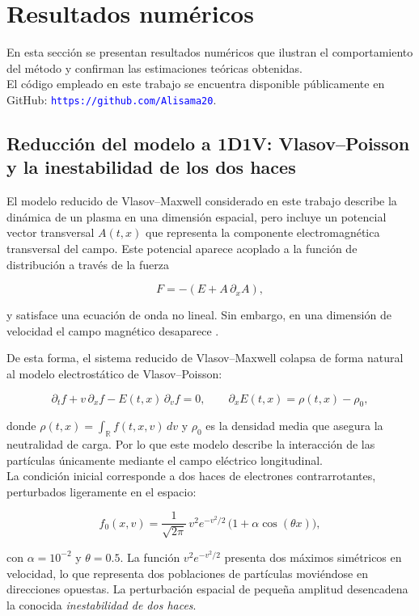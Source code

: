\documentclass[11pt,a4paper,twoside,pdf]{article}
\numberwithin{equation}{section}
\begin{document}
\section{Resultados numéricos}

En esta sección se presentan resultados numéricos que ilustran el
comportamiento del método y confirman las estimaciones teóricas obtenidas.\\

El código empleado en este trabajo se encuentra disponible públicamente en GitHub: \textcolor{blue}{\texttt{https://github.com/Alisama20}}.



\subsection{Reducción del modelo a 1D1V: Vlasov–Poisson y la inestabilidad de los dos haces}



El modelo reducido de Vlasov--Maxwell considerado en este trabajo describe la
dinámica de un plasma en una dimensión espacial, pero incluye un potencial vector
transversal $A(t,x)$ que representa la componente electromagnética transversal del
campo. Este potencial aparece acoplado a la función de distribución a través de la
fuerza


\[
F = -\left(E + A\,\partial_x A\right),
\]


y satisface una ecuación de onda no lineal. Sin embargo, en una dimensión de velocidad el campo magnético desaparece \cite{martin2021campo}.

De esta forma, el sistema reducido de Vlasov--Maxwell colapsa de forma
natural al modelo electrostático de Vlasov--Poisson:


\[
\partial_t f + v\,\partial_x f - E(t,x)\,\partial_v f = 0,
\qquad
\partial_x E(t,x) = \rho(t,x) - \rho_0,
\]


donde $\rho(t,x)=\int_{\mathbb{R}} f(t,x,v)\,dv$ y $\rho_0$ es la densidad media que asegura la neutralidad de carga.
Por lo que este modelo describe la interacción de las partículas únicamente mediante el campo
eléctrico longitudinal.\\


La condición inicial corresponde a dos haces de electrones contrarrotantes, perturbados ligeramente en el espacio:


\[
f_0(x,v) = \frac{1}{\sqrt{2\pi}}\,v^2 e^{-v^2/2}\,\big(1+\alpha\cos(\theta x)\big),
\]


con $\alpha=10^{-2}$ y $\theta=0.5$. La función $v^2 e^{-v^2/2}$ presenta dos máximos
simétricos en velocidad, lo que representa dos poblaciones de partículas moviéndose
en direcciones opuestas. La perturbación espacial de pequeña amplitud desencadena la conocida \textit{inestabilidad de dos haces}.
\end{document}
